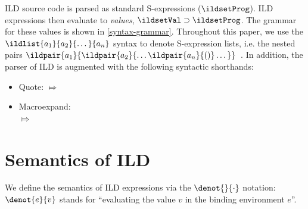 ILD source code is parsed as standard S-expressions (\(\ildsetProg\)). ILD expressions
then evaluate to \emph{values}, \(\ildsetVal \supset \ildsetProg\). The grammar for
these values is shown in \cref{syntax-grammar}.
Throughout this paper, we use the \(\ildlist{a_1}{a_2}{\dots}{a_n}\)
syntax to denote S-expression lists, i.e. the nested pairs
\(\ildpair{a_1}{\ildpair{a_2}{\dots \ildpair{a_n}{()} \dots}}\)~\cite{sexp}.
In addition, the parser of ILD is augmented with the following syntactic shorthands:
\begin{itemize}
  \item Quote:  \(\Mapsto\) 
  \item Macroexpand: \\
     \(\Mapsto\) \\
\end{itemize}
\section{Semantics of ILD}
\label{semantics}
We define the semantics of ILD expressions via the \(\denot{}{\cdot}\) notation:
\(\denot{e}{v}\) stands for ``evaluating the value \(v\) in the binding environment
\(e\)''.

